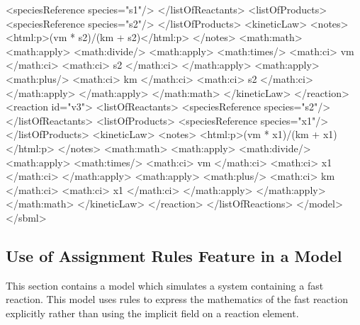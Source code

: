 \documentclass[10pt]{cekarticle}
\begin{document}
\begin{example}
                    <speciesReference species="s1"/>
                </listOfReactants>
                <listOfProducts>
                    <speciesReference species="s2"/>
                </listOfProducts>
                <kineticLaw>
                    <notes>
                        <html:p>(vm * s2)/(km + s2)</html:p>
                    </notes>
                    <math:math>
                        <math:apply>
                            <math:divide/>
                            <math:apply>
                                <math:times/>
                                <math:ci> vm </math:ci>
                                <math:ci> s2 </math:ci>
                            </math:apply>
                            <math:apply>
                                <math:plus/>
                                <math:ci> km </math:ci>
                                <math:ci> s2 </math:ci>
                            </math:apply>
                        </math:apply>
                    </math:math>
                </kineticLaw>
            </reaction>
            <reaction id="v3">
                <listOfReactants>
                    <speciesReference species="s2"/>
                </listOfReactants>
                <listOfProducts>
                    <speciesReference species="x1"/>
                </listOfProducts>
                <kineticLaw>
                    <notes>
                        <html:p>(vm * x1)/(km + x1)</html:p>
                    </notes>
                    <math:math>
                        <math:apply>
                            <math:divide/>
                            <math:apply>
                                <math:times/>
                                <math:ci> vm </math:ci>
                                <math:ci> x1 </math:ci>
                            </math:apply>
                            <math:apply>
                                <math:plus/>
                                <math:ci> km </math:ci>
                                <math:ci> x1 </math:ci>
                            </math:apply>
                        </math:apply>
                    </math:math>
                </kineticLaw>
            </reaction>
        </listOfReactions>
    </model>
</sbml>
\end{example}

\subsection{Use of Assignment Rules Feature in a Model}
\label{apdx:rules-eg}
This section contains a model which simulates a system containing
a fast reaction. This model uses rules to express the mathematics
of the fast reaction explicitly rather than using the implicit
 field on a reaction element.
\end{document}
